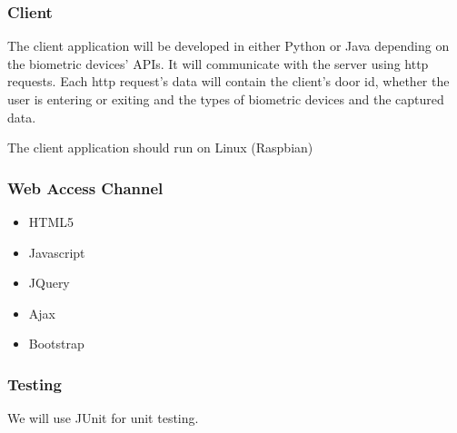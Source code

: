 \subsubsection{Client}
The client application will be developed in either Python or Java depending on the biometric devices' APIs. It will communicate with the server using http requests. Each http request's data will contain the client's door id, whether the user is entering or exiting and the types of biometric devices and the captured data. 

The client application should run on Linux (Raspbian)

\subsubsection{Web Access Channel}
\begin{itemize}
	\item HTML5
	\item Javascript
	\item JQuery
	\item Ajax
	\item Bootstrap
\end{itemize}

\subsubsection{Testing}
We will use JUnit for unit testing.